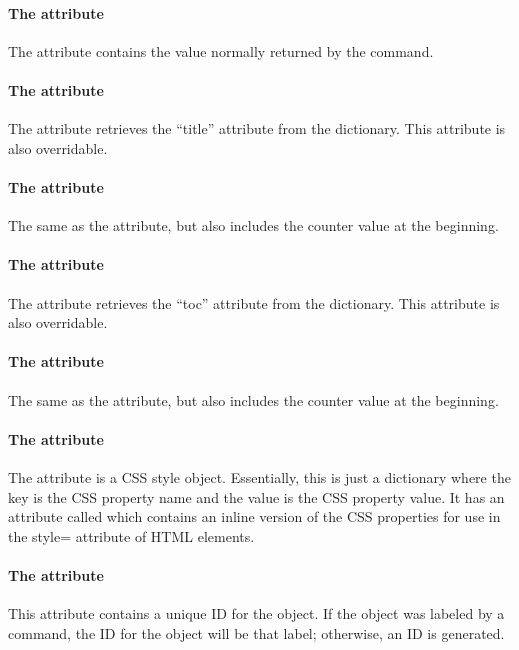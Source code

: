 \paragraph{The  attribute}
The  attribute contains the value normally returned
by the  command.

\paragraph{The  attribute}
The  attribute retrieves the ``title'' attribute from
the  dictionary.  This attribute is also overridable.

\paragraph{The  attribute}
The same as the  attribute, but also includes the
counter value at the beginning.

\paragraph{The  attribute}
The  attribute retrieves the ``toc'' attribute from
the  dictionary.  This attribute is also overridable.

\paragraph{The  attribute}
The same as the  attribute, but also includes the
counter value at the beginning.

\paragraph{The  attribute}
The  attribute is a CSS style object.  Essentially, this is
just a dictionary where the key is the CSS property name and the value
is the CSS property value.  It has an attribute called 
which contains an inline version of the CSS properties for use
in the style= attribute of HTML elements.

\paragraph{The  attribute}
This attribute contains a unique ID for the object.  If the object
was labeled by a  command, the ID for the object will
be that label; otherwise, an ID is generated.

